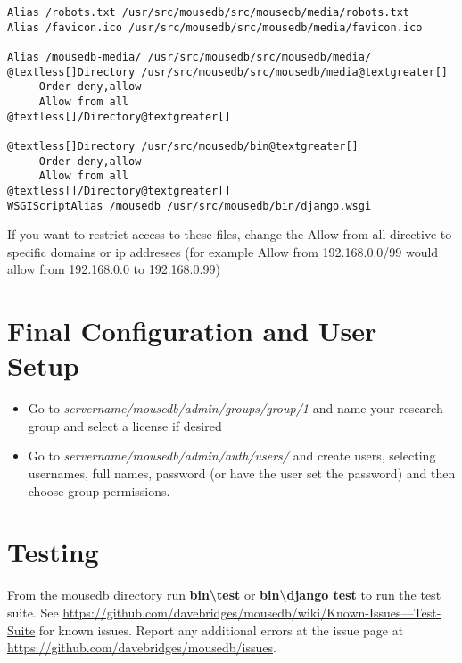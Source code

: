 \documentclass[letterpaper,10pt,english]{sphinxmanual}
\begin{document}
\begin{Verbatim}[commandchars=@\[\]]
Alias /robots.txt /usr/src/mousedb/src/mousedb/media/robots.txt
Alias /favicon.ico /usr/src/mousedb/src/mousedb/media/favicon.ico

Alias /mousedb-media/ /usr/src/mousedb/src/mousedb/media/
@textless[]Directory /usr/src/mousedb/src/mousedb/media@textgreater[]
     Order deny,allow
     Allow from all
@textless[]/Directory@textgreater[]

@textless[]Directory /usr/src/mousedb/bin@textgreater[]
     Order deny,allow
     Allow from all
@textless[]/Directory@textgreater[]
WSGIScriptAlias /mousedb /usr/src/mousedb/bin/django.wsgi
\end{Verbatim}

If you want to restrict access to these files, change the Allow from all directive to specific domains or ip addresses (for example Allow from 192.168.0.0/99 would allow from 192.168.0.0 to 192.168.0.99)



\section{Final Configuration and User Setup}
\label{installation:final-configuration-and-user-setup}\begin{itemize}
\item {} 
Go to \emph{servername/mousedb/admin/groups/group/1} and name your research group and select a license if desired


\item {} 
Go to \emph{servername/mousedb/admin/auth/users/} and create users, selecting usernames, full names, password (or have the user set the password) and then choose group permissions.


\end{itemize}


\section{Testing}
\label{installation:testing}
From the mousedb directory run \textbf{bin\textbackslash{}test} or \textbf{bin\textbackslash{}django test} to run the test suite.  See \href{https://github.com/davebridges/mousedb/wiki/Known-Issues---Test-Suite}{https://github.com/davebridges/mousedb/wiki/Known-Issues---Test-Suite} for known issues.  Report any additional errors at the issue page at \href{https://github.com/davebridges/mousedb/issues}{https://github.com/davebridges/mousedb/issues}.
\end{document}
